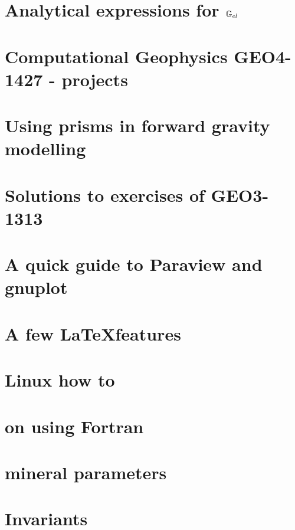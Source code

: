 \documentclass[a4paper,12pt]{report}
\begin{document}
\chapter{Analytical expressions for ${\mathbb{G}}_{el}$} \label{app:Gel}  %
\chapter{Computational Geophysics GEO4-1427 - projects}  %
\chapter{Using prisms in forward gravity modelling \label{app:prisms}}  %
\chapter{Solutions to exercises of GEO3-1313 \label{app:gravsols}}  %
\chapter{A quick guide to Paraview and gnuplot \label{app:plot}}  
\chapter{A few \LaTeX features}  %
\chapter{Linux how to}  %
\chapter{on using Fortran}  %
\chapter{mineral parameters}  %
\chapter{Invariants \label{app:invariants}}  %
\end{document}
